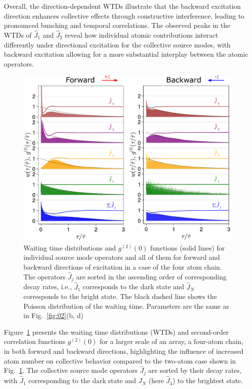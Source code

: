 \documentclass[aps,prl,twocolumn,superscriptaddress,showpacs,amsmath,amssymb]{revtex4-2}
\begin{document}
Overall, the direction-dependent WTDs illustrate that the backward excitation direction enhances collective effects through constructive interference, leading to pronounced bunching and temporal correlations. The observed peaks in the WTDs of $ \hat{J}_1 $ and $ \hat{J}_2 $ reveal how individual atomic contributions interact differently under directional excitation for the collective source modes, with backward excitation allowing for a more substantial interplay between the atomic operators.

\begin{figure}
    \begin{center}
        \includegraphics[width=0.95\columnwidth]{fig_4}
    \end{center}
    \caption{Waiting time distributions and $g^{(2)}(0)$ functions (solid lines) for individual source mode operators and all of them for forward and backward directions of excitation in a case of the four atom chain. The operators $\hat{J}_j$ are sorted in the ascending order of corresponding decay rates, i.e., $\hat{J}_1$ corresponds to the dark state and $\hat{J}_N$ corresponds to the bright state. The black dashed line shows the Poisson distribution of the waiting time. Parameters are the same as in Fig.~\ref{fig:02}(b, d)}\label{fig:04}
\end{figure}

Figure~\ref{fig:04} presents the waiting time distributions (WTDs) and second-order correlation functions $ g^{(2)}(0) $ for a larger scale of an array, a four-atom chain, in both forward and backward directions, highlighting the influence of increased atom number on collective behavior compared to the two-atom case shown in Fig.~\ref{fig:04}. The collective source mode operators $ \hat{J}_j $ are sorted by their decay rates, with $ \hat{J}_1 $ corresponding to the dark state and $ \hat{J}_N $ (here $ \hat{J}_4 $) to the brightest state.
\end{document}
